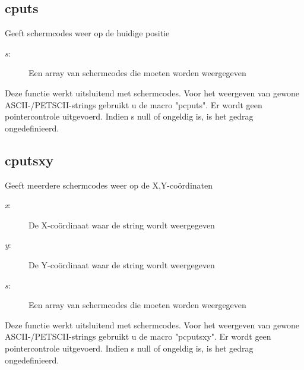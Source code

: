 \subsection{cputs}
\begin{description}[leftmargin=2.4cm,style=nextline]
\item [Beschrijving:] {Geeft schermcodes weer op de huidige positie}\item [Syntaxis:] \item [Parameters:]
\begin{description}
\item [{\em s}:] {Een array van schermcodes die moeten worden weergegeven}
\end{description}
\item [Opmerkingen:] {Deze functie werkt uitsluitend met schermcodes. Voor het weergeven van   gewone ASCII-/PETSCII-strings gebruikt u de macro "pcputs". Er wordt geen pointercontrole   uitgevoerd.  Indien s null of ongeldig is, is het gedrag ongedefinieerd. }
\end{description}

\subsection{cputsxy}
\begin{description}[leftmargin=2.4cm,style=nextline]
\item [Beschrijving:] {Geeft meerdere schermcodes weer op de X,Y-coördinaten}\item [Syntaxis:] \item [Parameters:]
\begin{description}
\item [{\em x}:] {De X-coördinaat waar de string wordt   weergegeven}\item [{\em y}:] {De Y-coördinaat waar de string wordt weergegeven}\item [{\em s}:] {Een array van schermcodes die moeten worden weergegeven}
\end{description}
\item [Opmerkingen:] {Deze functie werkt uitsluitend met schermcodes. Voor het weergeven van   gewone ASCII-/PETSCII-strings gebruikt u de macro "pcputsxy". Er wordt geen pointercontrole   uitgevoerd.  Indien s null of ongeldig is, is het gedrag ongedefinieerd. }
\end{description}

